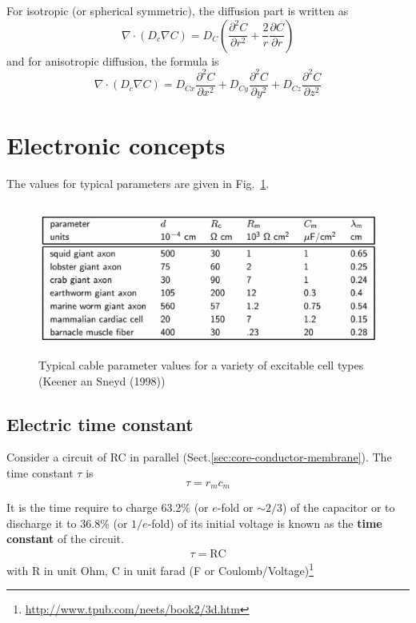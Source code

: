 For isotropic (or spherical symmetric), the diffusion part is written as
\citep{crank1975}
\begin{equation}
\nabla \cdot (D_c\nabla C) = D_C \left( \frac{\partial^2 C}{\partial r^2} +
\frac{2}{r}\frac{\partial C}{\partial r} \right)
\end{equation} 
and for anisotropic diffusion, the formula is
\begin{equation}
\nabla \cdot (D_c\nabla C) = D_{Cx}\frac{\partial^2 C}{\partial x^2} +
D_{Cy}\frac{\partial^2 C}{\partial y^2} + 
D_{Cz}\frac{\partial^2 C}{\partial z^2} 
\end{equation}


\section{Electronic concepts}
\label{sec:basic-concepts}

The values for typical parameters are given in
Fig.~\ref{fig:cable_param}. 

\begin{figure}[hbt]
  \centerline{\includegraphics[height=5cm,
    angle=0]{./images/cable_parameters.eps}}
  \caption{Typical cable parameter values for a variety of excitable
    cell types (Keener an Sneyd (1998))}
  \label{fig:cable_param}
\end{figure}

\subsection{Electric time constant}
\label{sec:time-constant}

Consider a circuit of RC in parallel (Sect.\ref{sec:core-conductor-membrane}).
The time constant $\tau$ is
\begin{equation}
\tau = r_m c_m
\end{equation}

It is the time require to charge 63.2\% (or $e$-fold or $\sim 2/3$) of the
capacitor or to discharge it to 36.8\% (or $1/e$-fold) of its initial voltage is
known as the {\bf time constant} of the circuit.
\begin{eqnarray}
  \label{eq:490}
  \tau = \text{RC}
\end{eqnarray}
with R in unit Ohm, C in unit farad (F or
Coulomb/Voltage)\footnote{\url{http://www.tpub.com/neets/book2/3d.htm}}


